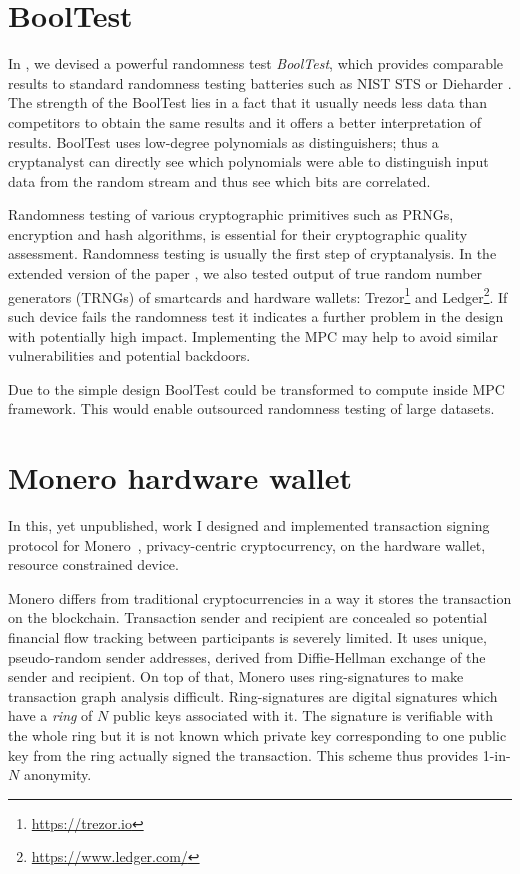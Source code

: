 \documentclass[
  digital, %
  twoside, %
  table,   %
  lof,     %
  lot,     %
]{fithesis3}
\newcounter{ph4_show_guides}
\theoremstyle{definition}
\theoremstyle{remark}
\newcommand{\shrug}[1][]{%
	\begin{tikzpicture}[baseline,x=0.8\ht\strutbox,y=0.8\ht\strutbox,line width=0.125ex,#1]
	\def\arm{(-2.5,0.95) to (-2,0.95) (-1.9,1) to (-1.5,0) (-1.35,0) to (-0.8,0)};
	\draw \arm;
	\draw[xscale=-1] \arm;
	\def\headpart{(0.6,0) arc[start angle=-40, end angle=40,x radius=0.6,y radius=0.8]};
	\draw \headpart;
	\draw[xscale=-1] \headpart;
	\def\eye{(-0.075,0.15) .. controls (0.02,0) .. (0.075,-0.15)};
	\draw[shift={(-0.3,0.8)}] \eye;
	\draw[shift={(0,0.85)}] \eye;
	\draw (-0.1,0.2) to [out=15,in=-100] (0.4,0.95); 
	\end{tikzpicture}}
\begin{document}
\section{BoolTest}\label{sec:res:booltest} %
In \cite{booltest_secrypt2017}, we devised a powerful randomness test {\emph{BoolTest}}, which provides comparable results to standard randomness testing batteries such as NIST STS \cite{Bassham:2010:SRS:2206233} or Dieharder \cite{dieharder}. The strength of the BoolTest lies in a fact that it usually needs less data than competitors to obtain the same results and it offers a better interpretation of results. BoolTest uses low-degree polynomials as distinguishers; thus a cryptanalyst can directly see which polynomials were able to distinguish input data from the random stream and thus see which bits are correlated.

Randomness testing of various cryptographic primitives such as PRNGs, encryption and hash algorithms, is essential for their cryptographic quality assessment. Randomness testing is usually the first step of cryptanalysis. In the extended version of the paper \cite{booltest2}, we also tested output of true random number generators (TRNGs) of smartcards and hardware wallets: Trezor\footnote{\url{https://trezor.io}} and Ledger\footnote{\url{https://www.ledger.com/}}. If such device fails the randomness test it indicates a further problem in the design with potentially high impact. Implementing the MPC may help to avoid similar vulnerabilities and potential backdoors. 

Due to the simple design BoolTest could be transformed to compute inside MPC framework. This would enable outsourced randomness testing of large datasets.

\section{Monero hardware wallet}\label{sec:res:monero}
\label{sec:aim:monero_hw_wallet}
In this, yet unpublished, work I designed and implemented transaction signing protocol for Monero~\cite{zero_to_monero}, privacy-centric cryptocurrency, on the hardware wallet, resource constrained device. 

Monero differs from traditional cryptocurrencies in a way it stores the transaction on the blockchain. Transaction sender and recipient are concealed so potential financial flow tracking between participants is severely limited. It uses unique, pseudo-random sender addresses, derived from Diffie-Hellman exchange of the sender and recipient. On top of that, Monero uses ring-signatures to make transaction graph analysis difficult. Ring-signatures are digital signatures which have a \emph{ring} of $N$ public keys associated with it. The signature is verifiable with the whole ring but it is not known which private key corresponding to one public key from the ring actually signed the transaction. This scheme thus provides 1-in-$N$ anonymity.
\end{document}
